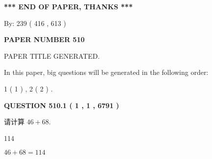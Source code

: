 \documentclass{ctexart}
\begin{document}
   
   
   
\vspace{1.0in} 
{\textbf{\large{ *** END OF PAPER, THANKS *** }}} 
   
   
\hspace{1.0in} By: 
 239 ( 416 ,  613 )
   
   
   
   
\newpage 
\setcounter{page}{ 
   510001 } 
   
   
   
   
 {\textbf{ \Large{ PAPER NUMBER  510  }}}
   
   
\vspace{0.2in}
   
   
   
   
   
   
   
   
 \vspace{0.2in}
 
 
 
 
   
   
 PAPER TITLE GENERATED.
   
   
   
\vspace{0.2in}
   
In this paper, big questions will be generated in the following order: 
   
   
   1 ( 1 )
 ,
   2 ( 2 )
 .
  
\vspace{0.2in}
  
{\textbf{\Large{QUESTION
510.1 
 ( 1 , 1 , 6791 )
}}}
  
  
 
请计算 $ %
46 +  %
68 $.
 
 
 
\noindent{}
 
 

114
 
 
\noindent{}
 
 

 
 
 
\noindent{}
 
 

$ %
46 +  %
68=   %
114$
 
\end{document}
